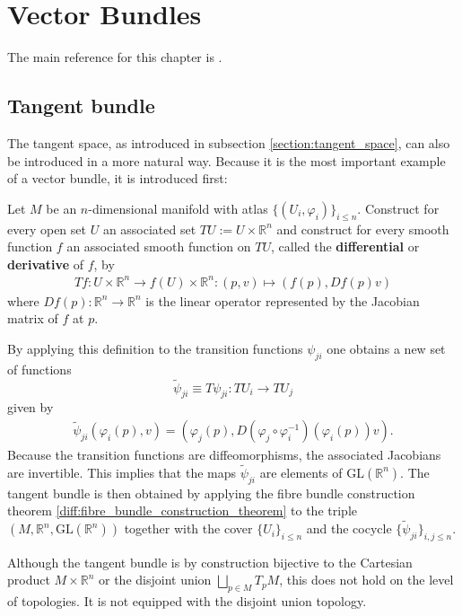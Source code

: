 \chapter{Vector Bundles}\label{chapter:vector_bundles}

    The main reference for this chapter is \cite{bott_tu}.

\section{Tangent bundle}

    The tangent space, as introduced in subsection \ref{section:tangent_space}, can also be introduced in a more natural way. Because it is the most important example of a vector bundle, it is introduced first:
    \begin{construct}
        Let $M$ be an $n$-dimensional manifold with atlas $\{(U_i,\varphi_i)\}_{i\leq n}$. Construct for every open set $U$ an associated set $TU := U\times\mathbb{R}^n$ and construct for every smooth function $f$ an associated smooth function on $TU$, called the \textbf{differential} or \textbf{derivative} of $f$, by
        \begin{gather}
            \label{diff:T_function}
            Tf:U\times\mathbb{R}^n\rightarrow f(U)\times\mathbb{R}^n:(p,v)\mapsto(f(p),Df(p)v)
        \end{gather}
        where $Df(p):\mathbb{R}^n\rightarrow\mathbb{R}^n$ is the linear operator represented by the Jacobian matrix of $f$ at $p$.

        By applying this definition to the transition functions $\psi_{ji}$ one obtains a new set of functions \[\widetilde{\psi}_{ji} \equiv T\psi_{ji}:TU_i\rightarrow TU_j\] given by
        \begin{gather}
            \widetilde{\psi}_{ji}(\varphi_i(p),v) = \left(\varphi_j(p), D(\varphi_j\circ\varphi_i^{-1})(\varphi_i(p))v\right).
        \end{gather}
        Because the transition functions are diffeomorphisms, the associated Jacobians are invertible. This implies that the maps $\widetilde\psi_{ji}$ are elements of $\text{GL}(\mathbb{R}^n)$. The tangent bundle is then obtained by applying the fibre bundle construction theorem \ref{diff:fibre_bundle_construction_theorem} to the triple $(M, \mathbb{R}^n,\text{GL}(\mathbb{R}^n))$ together with the cover $\{U_i\}_{i\leq n}$ and the cocycle $\{\widetilde\psi_{ji}\}_{i,j\leq n}$.
    \end{construct}
    \begin{remark}
        Although the tangent bundle is by construction bijective to the Cartesian product $M\times\mathbb{R}^n$ or the disjoint union $\bigsqcup_{p\in M}T_pM$, this does not hold on the level of topologies. It is not equipped with the disjoint union topology.
    \end{remark}

